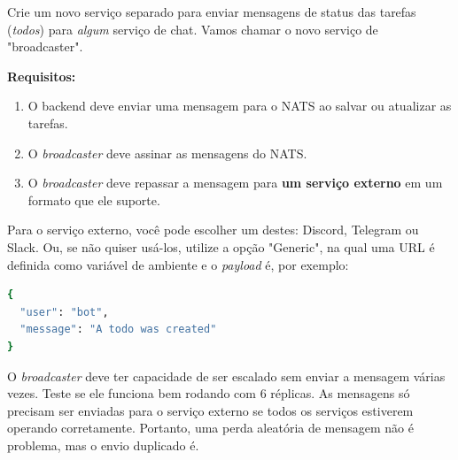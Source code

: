 \documentclass[11pt,a4paper]{article}
\begin{document}
\begin{tcolorbox}[colback=blue!5!white,colframe=blue!75!black,title=Exercício: 4.6. O projeto, etapa 23]
Crie um novo serviço separado para enviar mensagens de status das tarefas (\textit{todos}) para \textit{algum} serviço de chat. Vamos chamar o novo serviço de "broadcaster".

\textbf{Requisitos:}
\begin{enumerate}
    \item O backend deve enviar uma mensagem para o NATS ao salvar ou atualizar as tarefas.
    \item O \textit{broadcaster} deve assinar as mensagens do NATS.
    \item O \textit{broadcaster} deve repassar a mensagem para \textbf{um serviço externo} em um formato que ele suporte.
\end{enumerate}

Para o serviço externo, você pode escolher um destes: Discord, Telegram ou Slack. Ou, se não quiser usá-los, utilize a opção "Generic", na qual uma URL é definida como variável de ambiente e o \textit{payload} é, por exemplo:

\begin{lstlisting}[language=bash]
{
  "user": "bot",
  "message": "A todo was created"
}
\end{lstlisting}

O \textit{broadcaster} deve ter capacidade de ser escalado sem enviar a mensagem várias vezes. Teste se ele funciona bem rodando com 6 réplicas. As mensagens só precisam ser enviadas para o serviço externo se todos os serviços estiverem operando corretamente. Portanto, uma perda aleatória de mensagem não é problema, mas o envio duplicado é.
\end{tcolorbox}
\end{document}

